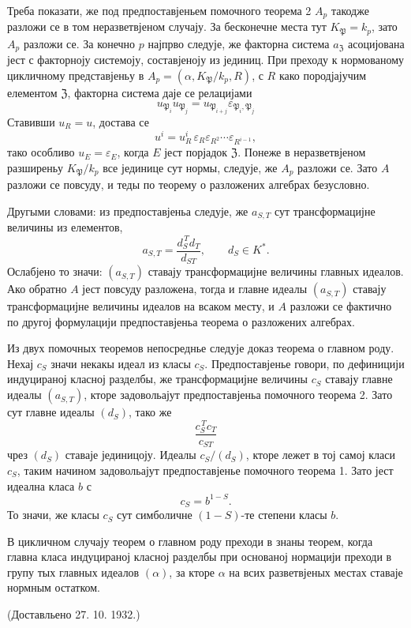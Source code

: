 ﻿\documentclass[11pt]{article}
\providecommand{\PP}{\mathfrak P}
\begin{document}
Треба показати, же под предпоставјеньем помочного теорема 2 \(A_p\) такодже разложи се в том неразветвјеном случају. За бесконечне места тут \(K_\PP=k_p\), зато \(A_p\) разложи се. За конечно \(p\) најпрво следује, же факторна система \(a_{\mathfrak Z}\) асоцијована јест с факторноју системоју, составјеноју из јединиц. При преходу к нормованому цикличному представјеньу в \(A_p=(\alpha,K_\PP/k_p,R)\), с \(R\) како породјајучим елементом \(\mathfrak Z\), факторна система даје се релацијами
\[
        u_{\PP_i}u_{\PP_j}=u_{\PP_{i+j}}\varepsilon_{\PP_i,\PP_j}
\]
Ставивши \(u_R=u\), достава се
\[
        u^i=u_R^i\,\varepsilon_R\varepsilon_{R^2}\cdots \varepsilon_{R^{i-1}},
\]
тако особливо \(u_E=\varepsilon_E\), когда \(E\) јест порјадок \(\mathfrak Z\). Понеже в неразветвјеном разширеньу \(K_\PP/k_p\) все јединице сут нормы, следује, же \(A_p\) разложи се. Зато \(A\) разложи се повсуду, и теды по теорему о разложених алгебрах безусловно.

Другыми словами: из предпоставјеньа следује, же \(a_{S,T}\) сут трансформацијне величины из елементов,
\[
        a_{S,T}=\frac{d_S^{\,T}d_T}{d_{ST}},
        \qquad d_S\in K^*.
\]
Ослабјено то значи: \((a_{S,T})\) ставају трансформацијне величины главных идеалов. Ако обратно \(A\) јест повсуду разложена, тогда и главне идеалы \((a_{S,T})\) ставају трансформацијне величины идеалов на всаком месту, и \(A\) разложи се фактично по другој формулацији предпоставјеньа теорема о разложених алгебрах.

Из двух помочных теоремов непосреднье следује доказ теорема о главном роду. Нехај \(c_S\) значи некакы идеал из класы \(c_S\). Предпоставјенье говори, по дефиницији индуцираној класној разделбы, же трансформацијне величины \(c_S\) ставају главне идеалы \((a_{S,T})\), кторе задовольајут предпоставјеньа помочного теорема 2. Зато сут главне идеалы \((d_S)\), тако же
\[
        \frac{c_S^{\,T}c_T}{c_{ST}}
\]
чрез \((d_S)\) ставаје јединицоју. Идеалы \(c_S/(d_S)\), кторе лежет в тој самој класи \(c_S\), таким начином задовольајут предпоставјенье помочного теорема 1. Зато јест идеална класа \(b\) с
\[
        c_S=b^{1-S}.
\]
То значи, же класы \(c_S\) сут симболичне \((1-S)\)-те степени класы \(b\).

В цикличном случају теорем о главном роду преходи в знаны теорем, когда главна класа индуцираној класној разделбы при основаној нормацији преходи в групу тых главных идеалов \((\alpha)\), за кторе \(\alpha\) на всих разветвјеных местах ставаје нормным остатком.

\begin{center}
(Доставльено 27. 10. 1932.)
\end{center}
\end{document}
